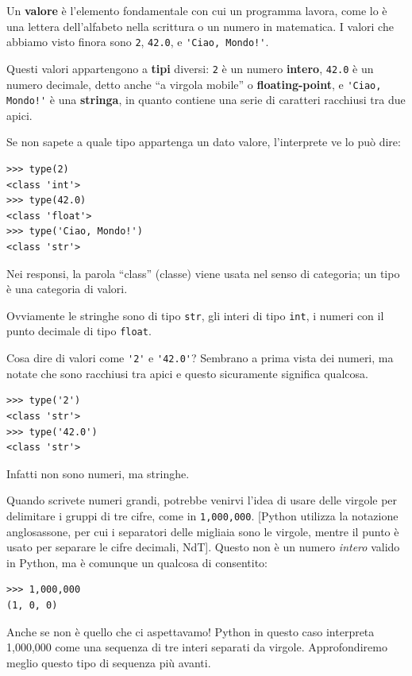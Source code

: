 \documentclass[10pt]{book}
\begin{document}
Un {\bf valore} è l'elemento fondamentale con cui un programma lavora, come lo è una lettera dell'alfabeto nella scrittura o un numero in matematica. I valori che abbiamo visto finora sono
{\tt 2}, {\tt 42.0}, e \verb"'Ciao, Mondo!'".

Questi valori appartengono a {\bf tipi} diversi:
{\tt 2} è un numero {\bf intero}, {\tt 42.0} è un numero decimale, detto anche ``a virgola mobile'' o {\bf floating-point}, e \verb"'Ciao, Mondo!'" è una {\bf stringa}, in quanto contiene una serie di caratteri racchiusi tra due apici.

Se non sapete a quale tipo appartenga un dato valore, l'interprete ve lo può dire:

\begin{verbatim}
>>> type(2)
<class 'int'>
>>> type(42.0)
<class 'float'>
>>> type('Ciao, Mondo!')
<class 'str'>
\end{verbatim}
%

Nei responsi, la parola ``class'' (classe) viene usata nel senso di categoria; un tipo è una categoria di valori.

Ovviamente le stringhe sono di tipo {\tt str}, gli interi di
tipo {\tt int}, i numeri con il punto decimale di tipo {\tt float}.

Cosa dire di valori come \verb"'2'" e \verb"'42.0'"?
Sembrano a prima vista dei numeri, ma notate che sono racchiusi tra apici e questo sicuramente significa qualcosa. 

\begin{verbatim}
>>> type('2')
<class 'str'>
>>> type('42.0')
<class 'str'>
\end{verbatim}
%
Infatti non sono numeri, ma stringhe.

Quando scrivete numeri grandi, potrebbe venirvi l'idea di usare delle virgole per delimitare i gruppi di tre cifre, come in {\tt 1,000,000}. [Python utilizza la notazione anglosassone, per cui i separatori delle migliaia sono le virgole, mentre il punto è usato per separare le cifre decimali, NdT]. Questo non è un numero {\em intero} valido in Python, ma è comunque un qualcosa di consentito:

\begin{verbatim}
>>> 1,000,000
(1, 0, 0)
\end{verbatim}
%
Anche se non è quello che ci aspettavamo! Python in questo caso interpreta 1,000,000 come una sequenza di tre interi separati da virgole. Approfondiremo meglio questo tipo di sequenza più avanti.
\end{document}
